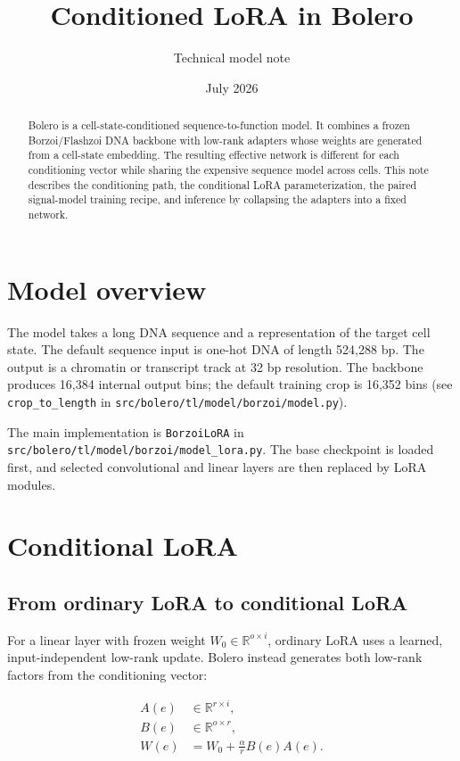 \documentclass[11pt]{article}
\title{Conditioned LoRA in Bolero}
\author{Technical model note}
\date{July 2026}
\newcommand{\code}[1]{\texttt{\small #1}}
\newcommand{\Wbase}{W_{0}}
\newcommand{\condvec}{e}
\begin{document}
\maketitle

\begin{abstract}
Bolero is a cell-state-conditioned sequence-to-function model. It combines a frozen
Borzoi/Flashzoi DNA backbone with low-rank adapters whose weights are generated from a
cell-state embedding. The resulting effective network is different for each conditioning
vector while sharing the expensive sequence model across cells. This note describes the
conditioning path, the conditional LoRA parameterization, the paired signal-model training
recipe, and inference by collapsing the adapters into a fixed network.
\end{abstract}

\section{Model overview}

The model takes a long DNA sequence and a representation of the target cell state. The
default sequence input is one-hot DNA of length 524,288 bp. The output is a chromatin or
transcript track at 32 bp resolution. The backbone produces 16,384 internal output bins;
the default training crop is 16,352 bins (see \code{crop\_to\_length} in
\code{src/bolero/tl/model/borzoi/model.py}).

The main implementation is \code{BorzoiLoRA} in
\code{src/bolero/tl/model/borzoi/model\_lora.py}. The base checkpoint is loaded first,
and selected convolutional and linear layers are then replaced by LoRA modules.

\section{Conditional LoRA}

\subsection{From ordinary LoRA to conditional LoRA}

For a linear layer with frozen weight $\Wbase\in\mathbb{R}^{o\times i}$, ordinary LoRA
uses a learned, input-independent low-rank update. Bolero instead generates both low-rank
factors from the conditioning vector:

\begin{align}
A(\condvec) &\in \mathbb{R}^{r\times i},\\
B(\condvec) &\in \mathbb{R}^{o\times r},\\
W(\condvec) &= \Wbase + \frac{\alpha}{r}B(\condvec)A(\condvec).
\end{align}
\end{document}
